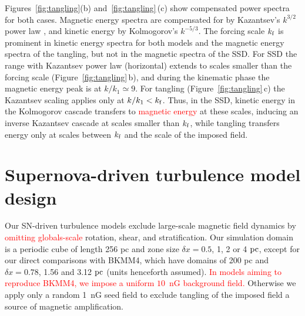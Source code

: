 \documentclass[preprint2]{aastex63}
\newcommand\kf{k_{\rm f} }
\newcommand\pc{~ {\rm pc}}
\newcommand\dx{ {\delta x}}
\newcommand\BKM{{\sf BKMM4}}
\newcommand{\fg}[1]{\textcolor{midgreen}{#1}}
\newcommand{\mjk}[1]{\textcolor{red}{#1}}
\begin{document}
 \fg{Figures~\ref{fig:tangling}(b) and~\ref{fig:tangling}\,(c) show
 compensated power spectra for both cases.}
 Magnetic energy spectra are compensated \fg{for by} Kazantsev's $k^{3/2}$
 \fg{power law} \citep{Sch02,BS14}, and kinetic energy \fg{by} Kolmogorov's
 $k^{-5/3}$.
 The forcing scale $\kf$ is \fg{prominent} in kinetic energy \fg{spectra for
 both models} and the magnetic energy \fg{spectra of the tangling}, but
 \fg{not} \fg{in the magnetic spectra of the SSD}.
 \fg{For SSD the range with Kazantsev power law (horizontal) extends to scales
 smaller than the forcing scale (Figure~\ref{fig:tangling}\,b), and during the
 kinematic phase the magnetic energy peak is at $k/k_1\simeq9$.}
 \fg{For tangling (Figure~\ref{fig:tangling}\,c) the Kazantsev
 \fg{scaling} applies only at $k/k_1<\kf$.} 
 Thus, in the SSD, kinetic energy \fg{in the Kolmogorov cascade} transfers to
 \mjk{magnetic energy} 
 at these scales, inducing an inverse Kazantsev \fg{cascade}
 at scales \fg{smaller than} $\kf$, while tangling transfers energy only at
 scales between $\kf$ and the scale of the imposed field.
 
\section{\fg{Supernova-driven} turbulence model design} \label{sec:model}

 \fg{Our} SN-driven turbulence models exclude large-scale magnetic field
 dynamics by \mjk{omitting globals-scale} rotation, shear, and stratification.
 Our simulation domain is a periodic cube of length 256 pc and zone size
 $\dx=0.5$, 1, 2 or 4$\pc$\fg{, except for \fg{our} direct comparisons with
 \BKM, \fg{ which have} domains \fg{of} 200 pc and $\dx=0.78$, 1.56 and
 3.12$\pc$ (units henceforth assumed)}.
 \mjk{In models aiming to reproduce \BKM, we impose a uniform $10$~nG 
 background field.}
 \fg{Otherwise we apply only a} random 1~nG seed field \fg{to} exclude
 tangling of \fg{the} imposed field a source of magnetic amplification.
\end{document}
